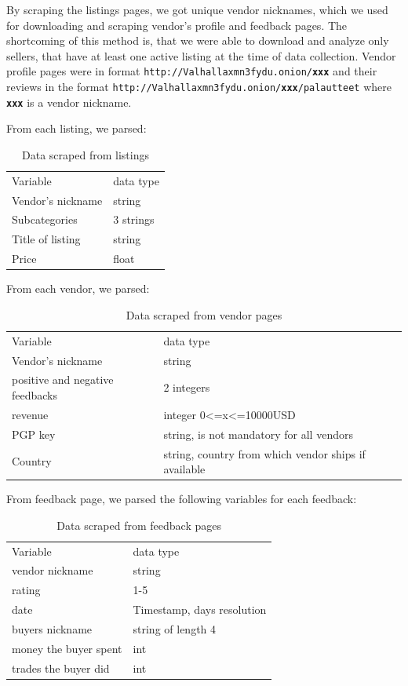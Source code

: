 \documentclass[
  digital, %
  table,   %
  lof,     %
  lot,     %
  oneside
]{fithesis3}
\begin{document}
By scraping the listings pages, we got unique vendor nicknames,
which we used for downloading and scraping vendor's profile and feedback pages.
The shortcoming of this method is, that we were able to download and analyze only sellers, 
that have at least one active listing at the time of data collection. 
Vendor profile pages were in format \texttt{http://Valhallaxmn3fydu.onion/\textbf{xxx}}
and their reviews in the format
 \texttt{http://Valhallaxmn3fydu.onion/\textbf{xxx}/palautteet} where \texttt{\textbf{xxx}}
is a vendor nickname. 
 
From each listing, we parsed:

\begin{table}
    \caption{Data scraped from listings}
    \label{datalist}
    \begin{tabular}{|l|l|}
 Variable & data type\\
 Vendor's nickname & string\\
 Subcategories & 3 strings\\
 Title of listing & string\\
 Price & float\\
    \end{tabular}
\end{table}

From each vendor, we parsed:

\begin{table}
    \caption{Data scraped from vendor pages}
    \label{datavendor}
    \begin{tabular}{|l|l|}
 Variable & data type\\
Vendor's nickname & string\\
positive and negative feedbacks & 2 integers\\
revenue & integer 0<=x<=10000USD\\
PGP key & string, is not mandatory for all vendors\\
Country & string, country from which vendor ships if available\\
    \end{tabular}
\end{table}

From feedback page, we parsed the following variables for each feedback:
\begin{table}
    \caption{Data scraped from feedback pages}
    \label{datafeedback}
    \begin{tabular}{|l|l|}
 Variable & data type\\
vendor nickname & string\\
rating & 1-5\\
date & Timestamp, days resolution\\
buyers nickname & string of length 4\\
money the buyer spent & int\\
trades the buyer did & int\\
   
    \end{tabular}
\end{table}
\end{document}
